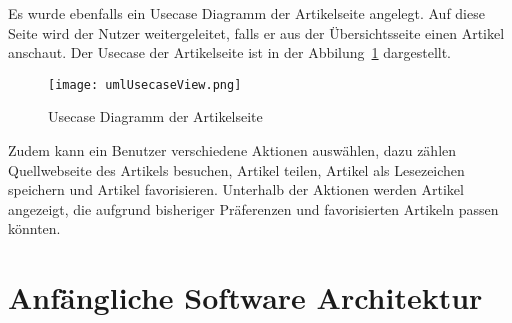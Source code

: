 Es wurde ebenfalls ein Usecase Diagramm der Artikelseite angelegt. Auf diese Seite
wird der Nutzer weitergeleitet, falls er aus der Übersichtsseite einen Artikel anschaut.
Der Usecase der Artikelseite ist in der Abbilung~\ref{fig:usecaseView} dargestellt.
\begin{figure}
    \texttt{[image: umlUsecaseView.png]}
    \caption{Usecase Diagramm der Artikelseite}
    \label{fig:usecaseView}
\end{figure}
Zudem kann ein Benutzer verschiedene Aktionen auswählen, dazu zählen Quellwebseite des Artikels besuchen, Artikel teilen, Artikel als 
Lesezeichen speichern und Artikel favorisieren. Unterhalb der Aktionen werden Artikel angezeigt, die aufgrund bisheriger Präferenzen und 
favorisierten Artikeln passen könnten.

\section{Anfängliche Software Architektur}
